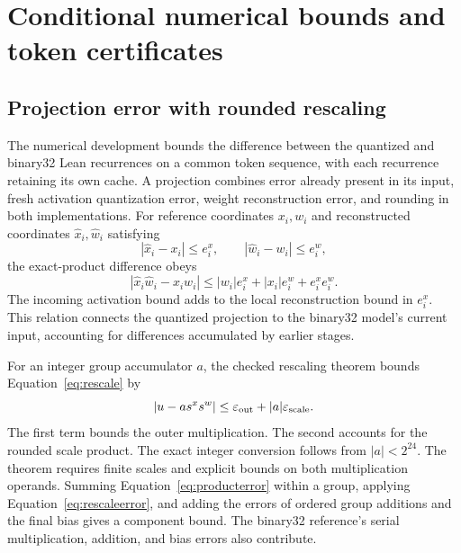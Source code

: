 \section{Conditional numerical bounds and token certificates}
\label{sec:numerical}

\subsection{Projection error with rounded rescaling}

The numerical development bounds the difference between the quantized and binary32 Lean recurrences on a common token sequence, with each recurrence retaining its own cache.  A projection combines error already present in its input, fresh activation quantization error, weight reconstruction error, and rounding in both implementations.  For reference coordinates $x_i,w_i$ and reconstructed coordinates $\widehat x_i,\widehat w_i$ satisfying
\[
 |\widehat x_i-x_i|\leq e^x_i,\qquad
 |\widehat w_i-w_i|\leq e^w_i,
\]
the exact-product difference obeys
\begin{equation}
 |\widehat x_i\widehat w_i-x_iw_i|
 \leq |w_i|e^x_i+|x_i|e^w_i+e^x_i e^w_i.
 \label{eq:producterror}
\end{equation}
The incoming activation bound adds to the local reconstruction bound in $e^x_i$.  This relation connects the quantized projection to the binary32 model's current input, accounting for differences accumulated by earlier stages.

For an integer group accumulator $a$, the checked rescaling theorem bounds Equation~\eqref{eq:rescale} by
\begin{equation}
 |u-a s^x s^w|\leq\varepsilon_{\rm out}+|a|\varepsilon_{\rm scale}.
 \label{eq:rescaleerror}
\end{equation}
The first term bounds the outer multiplication.  The second accounts for the rounded scale product.  The exact integer conversion follows from $|a|<2^{24}$.  The theorem requires finite scales and explicit bounds on both multiplication operands.  Summing Equation~\eqref{eq:producterror} within a group, applying Equation~\eqref{eq:rescaleerror}, and adding the errors of ordered group additions and the final bias gives a component bound.  The binary32 reference's serial multiplication, addition, and bias errors also contribute.

